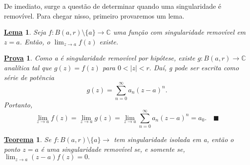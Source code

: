 \documentclass{article}
\newtheorem*{theorem*}{\underline{Teorema}}
\newtheorem*{proof*}{\underline{Prova}}
\newtheorem*{lmm*}{\underline{Lema}}
\renewcommand\qedsymbol{$\blacksquare$}
\begin{document}
  De imediato, surge a questão de determinar quando uma singularidade é removível. Para chegar nisso, primeiro provaremos um lema.
  \begin{lmm*}
    Seja \(f:B(a, r)\setminus{\{a\}}\rightarrow \mathbb{C}\) uma função com singularidade removível em \(z = a\). Então, o \(\lim_{z\to a}f(z)\) existe.
  \end{lmm*}
  \begin{proof*}
    Como a é singularidade removível por hipótese, existe \(g:B(a, r)\rightarrow \mathbb{C}\) analítica
    tal que \(g(z) = f(z)\) para \(0 < |z| < r.\) Daí, g pode ser escrita como série de potência 
    \[
      g(z) = \sum\limits_{n=0}^{\infty}a_{n}(z-a)^{n}.
    \]
    Portanto,
    \[
      \lim_{z\to a}f(z) = \lim_{z\to a} g(z) = \lim_{z\to a}\sum\limits_{n=0}^{\infty}a_{n}(z-a)^{n} = a_{0}.\quad \text{\qedsymbol}
    \]
  \end{proof*}
  \begin{theorem*}
    Se \(f:B(a, r)\setminus{\{a\}}\rightarrow \) tem singularidade isolada em a, então o ponto \(z=a\) é uma singularidade removível se, e somente se,
    \(\lim_{z\to a} (z-a)f(z) = 0.\)
  \end{theorem*}
\end{document}
